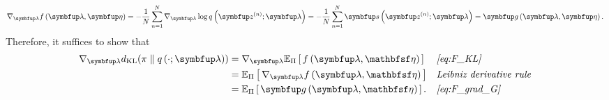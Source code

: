 \begin{proofEnd}
  \begin{align}
    \nabla_{\vlambda} f\left(\vlambda, \veta\right) = -\frac{1}{N} \sum^{N}_{n=1} \nabla_{\vlambda} \log q\left(\vz^{(n)}; \vlambda\right) = -\frac{1}{N} \sum^{N}_{n=1} \vs\left(\vz^{(n)}; \vlambda\right) = \vg\left(\vlambda, \veta\right).\label{eq:F_grad_G}
  \end{align}
  Therefore, it suffices to show that
  \begin{align*}
    \nabla_{\vlambda} \DKL{\pi}{q\left(\cdot; \vlambda\right)}
    &=
    \nabla_{\vlambda} \Esub{\Pi}{ f\left(\vlambda, \rvveta\right) }
    &&\text{\textit{\cref{eq:F_KL}}}
    \\
    &=
    \Esub{\Pi}{ \nabla_{\vlambda}  f\left(\vlambda, \rvveta\right) }
    &&\text{\textit{{Leibniz derivative rule}}}
    \\
    &=
    \Esub{\Pi}{ \vg\left(\vlambda, \rvveta\right) }.
    &&\text{\textit{\cref{eq:F_grad_G}}}
  \end{align*}
\end{proofEnd}

